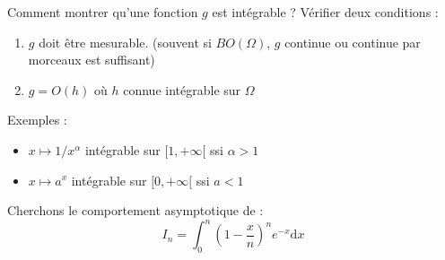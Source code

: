 \begin{note}{}{}
Comment montrer qu'une fonction $g$ est intégrable ? Vérifier deux conditions : 

\begin{enumerate}

    \item $g$ doit être mesurable. (souvent si $BO(\Omega)$, $g$ continue ou continue par morceaux est suffisant) 

    \item $g = O(h)$ où $h$ connue intégrable sur $\Omega$

\end{enumerate}

Exemples : 
\begin{itemize}

    \item $x \mapsto 1/ x ^{\alpha}$ intégrable sur $[1, + \infty[$ ssi $\alpha > 1$

    \item $x \mapsto a ^{x}$ intégrable sur $[0, +\infty[$ ssi $a<1$

\end{itemize}

\end{note}



\begin{Example}{}{}
Cherchons le comportement asymptotique de :
\begin{equation}
  I _ n = \int_{0}^{n} \left( 1-  \frac{x}{n} \right) ^{n} e ^{-x} \mathrm{d}x
\end{equation}
\end{Example}

